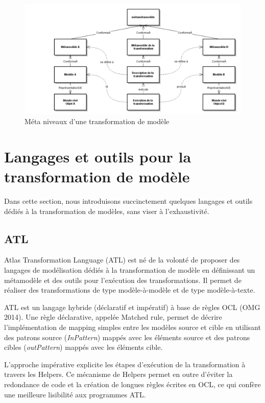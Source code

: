 \begin{figure}[!htbp]
 \begin{center}
  \includegraphics[width=1\textwidth]{images/Chapitre1/transfoPrincipe.png}
 \end{center}
 \caption{Méta niveaux d'une transformation de modèle}
 \label{fig:TransfoPrincipe}
\end{figure}

\section{Langages et outils pour la transformation de modèle}
Dans cette section, nous introduisons succinctement quelques langages et outils 
dédiés à la transformation de modèles, sans viser à l'exhaustivité.

\subsection{ATL}
\label{sec:ATL}
Atlas Transformation Language (ATL) \cite{jouault2006transforming} 
\cite{jouault2008atl} est né de la volonté de proposer des langages de 
modélisation dédiés à la transformation de modèle en définissant un métamodèle 
et des outils pour l'exécution des transformations. Il permet de réaliser des 
transformations de type modèle-à-modèle et de type modèle-à-texte.

ATL  est un langage hybride (déclaratif et impératif) à base de règles OCL (OMG 
2014). Une règle déclarative, appelée Matched rule, permet de décrire 
l'implémentation de mapping simples entre les modèles source et cible en 
utilisant des patrons source (\textit{InPattern}) mappés avec les éléments 
source et des patrons cibles (\textit{outPattern}) mappés avec les éléments 
cible. 

L'approche impérative explicite les étapes d'exécution de la transformation à 
travers les Helpers. Ce mécanisme de Helpers permet en outre d'éviter la 
redondance de code et la création de longues règles écrites en OCL, ce qui 
confère une meilleure lisibilité aux programmes ATL. 

